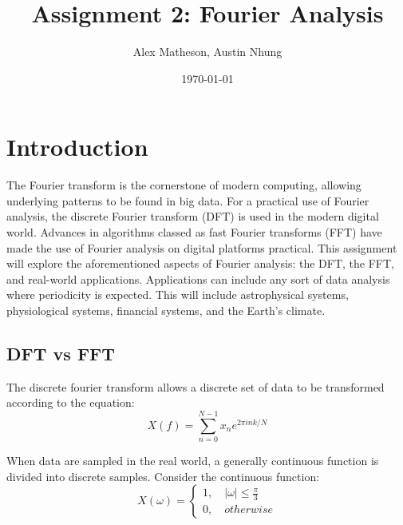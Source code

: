 \documentclass[twocolumn]{article}
\begin{document}
\title{Assignment 2: Fourier Analysis}
\author{Alex Matheson, Austin Nhung}
\date{\today}
\maketitle

\section{Introduction}
The Fourier transform is the cornerstone of modern computing, allowing underlying patterns to be found in big data. For a practical use of Fourier analysis, the discrete Fourier transform (DFT) is used in the modern digital world. Advances in algorithms classed as fast Fourier transforms (FFT) have made the use of Fourier analysis on digital platforms practical. This assignment will explore the aforementioned aspects of Fourier analysis: the DFT, the FFT, and real-world applications. Applications can include any sort of data analysis where periodicity is expected. This will include astrophysical systems, physiological systems, financial systems, and the Earth's climate.

\subsection{DFT vs FFT}
The discrete fourier transform allows a discrete set of data to be transformed according to the equation:
\begin{equation}
X(f) = \sum_{n=0}^{N-1} x_n e^{2\pi ink/N}
\end{equation}

When data are sampled in the real world, a generally continuous function is divided into discrete samples. Consider the continuous function:
\begin{equation}
X(\omega) = \begin{cases}
1, \quad |\omega| \leq \frac{\pi}{3} \\
0, \quad otherwise
\end{cases}
\end{equation}
\end{document}

